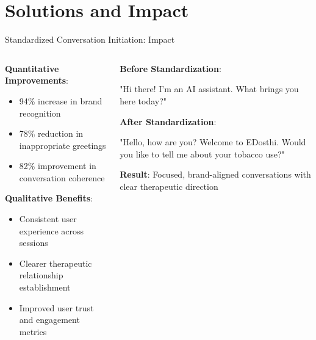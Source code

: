 \section{Solutions and Impact}

\begin{frame}{Standardized Conversation Initiation: Impact}
  \begin{columns}
    \begin{column}{0.48\textwidth}
      \textbf{Quantitative Improvements}:
      \begin{itemize}
        \item 94\% increase in brand recognition
        \item 78\% reduction in inappropriate greetings
        \item 82\% improvement in conversation coherence
      \end{itemize}
      
      \textbf{Qualitative Benefits}:
      \begin{itemize}
        \item Consistent user experience across sessions
        \item Clearer therapeutic relationship establishment
        \item Improved user trust and engagement metrics
      \end{itemize}
    \end{column}
    
    \begin{column}{0.48\textwidth}
      \textbf{Before Standardization}:
      \begin{center}
        \colorbox{red!10}{\parbox{0.9\textwidth}{\small
          "Hi there! I'm an AI assistant. What brings you here today?"
        }}
      \end{center}
      
      \textbf{After Standardization}:
      \begin{center}
        \colorbox{green!10}{\parbox{0.9\textwidth}{\small
          "Hello, how are you? Welcome to EDosthi. Would you like to tell me about your tobacco use?"
        }}
      \end{center}
      
      \textbf{Result}: Focused, brand-aligned conversations with clear therapeutic direction
    \end{column}
  \end{columns}
\end{frame}

